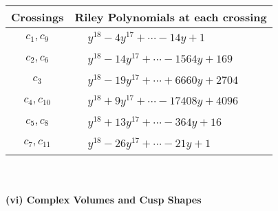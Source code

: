 \documentclass[1p]{elsarticle_modified}
\theoremstyle{definition}
\begin{document}
\begin{tabular}{m{50pt}|m{274pt}}
Crossings & \hspace{64pt}Riley Polynomials at each crossing \\
\hline $$\begin{aligned}c_{1},c_{9}\end{aligned}$$&$\begin{aligned}
&y^{18}-4 y^{17}+\cdots-14 y+1
\end{aligned}$\\
\hline $$\begin{aligned}c_{2},c_{6}\end{aligned}$$&$\begin{aligned}
&y^{18}-14 y^{17}+\cdots-1564 y+169
\end{aligned}$\\
\hline $$\begin{aligned}c_{3}\end{aligned}$$&$\begin{aligned}
&y^{18}-19 y^{17}+\cdots+6660 y+2704
\end{aligned}$\\
\hline $$\begin{aligned}c_{4},c_{10}\end{aligned}$$&$\begin{aligned}
&y^{18}+9 y^{17}+\cdots-17408 y+4096
\end{aligned}$\\
\hline $$\begin{aligned}c_{5},c_{8}\end{aligned}$$&$\begin{aligned}
&y^{18}+13 y^{17}+\cdots-364 y+16
\end{aligned}$\\
\hline $$\begin{aligned}c_{7},c_{11}\end{aligned}$$&$\begin{aligned}
&y^{18}-26 y^{17}+\cdots-21 y+1
\end{aligned}$\\
\hline
\end{tabular}\\~\\
\newpage\flushleft \textbf{(vi) Complex Volumes and Cusp Shapes}
\end{document}

